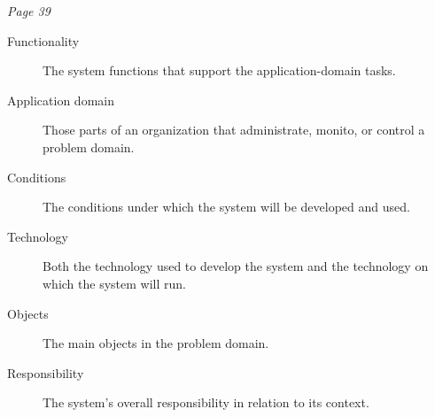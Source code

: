\textit{Page 39}
\begin{description}
    \item[Functionality] The system functions that support the application-domain tasks.
    \item[Application domain] Those parts of an organization that administrate, monito, or control a problem domain.
    \item[Conditions] The conditions under which the system will be developed and used.
    \item[Technology] Both the technology used to develop the system and the technology on which the system will run.
    \item[Objects] The main objects in the problem domain.
    \item[Responsibility] The system's overall responsibility in relation to its context.    
\end{description}
